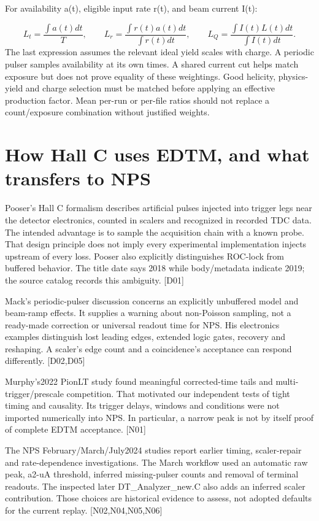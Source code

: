 For availability a(t), eligible input rate r(t), and beam current I(t):


\[
L_t=\frac{\int a(t)dt}{T},\qquad
L_r=\frac{\int r(t)a(t)dt}{\int r(t)dt},\qquad
L_Q=\frac{\int I(t)L(t)dt}{\int I(t)dt}.
\]
The last expression assumes the relevant ideal yield scales with charge. A periodic pulser samples availability at its own times. A shared current cut helps match exposure but does not prove equality of these weightings. Good helicity, physics-yield and charge selection must be matched before applying an effective production factor. Mean per-run or per-file ratios should not replace a count/exposure combination without justified weights.


\section{How Hall C uses EDTM, and what transfers to NPS}
Pooser's Hall C formalism describes artificial pulses injected into trigger legs near the detector electronics, counted in scalers and recognized in recorded TDC data. The intended advantage is to sample the acquisition chain with a known probe. That design principle does not imply every experimental implementation injects upstream of every loss. Pooser also explicitly distinguishes ROC-lock from buffered behavior. The title date says 2018 while body/metadata indicate 2019; the source catalog records this ambiguity. [D01]


Mack's periodic-pulser discussion concerns an explicitly unbuffered model and beam-ramp effects. It supplies a warning about non-Poisson sampling, not a ready-made correction or universal readout time for NPS. His electronics examples distinguish lost leading edges, extended logic gates, recovery and reshaping. A scaler's edge count and a coincidence's acceptance can respond differently. [D02,D05]


Murphy's2022 PionLT study found meaningful corrected-time tails and multi-trigger/prescale competition. That motivated our independent tests of tight timing and causality. Its trigger delays, windows and conditions were not imported numerically into NPS. In particular, a narrow peak is not by itself proof of complete EDTM acceptance. [N01]


The NPS February/March/July2024 studies report earlier timing, scaler-repair and rate-dependence investigations. The March workflow used an automatic raw peak, a2-uA threshold, inferred missing-pulser counts and removal of terminal readouts. The inspected later DT\_Analyzer\_new.C also adds an inferred scaler contribution. Those choices are historical evidence to assess, not adopted defaults for the current replay. [N02,N04,N05,N06]


